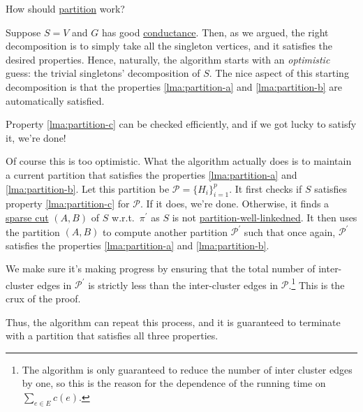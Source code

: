 \begin{problem*}
	How should \hyperref[algo:partition]{partition} work?
\end{problem*}
\begin{answer}
	Suppose \(S = V\) and \(G\) has good \hyperref[def:conductance]{conductance}. Then, as we argued, the right decomposition is to simply take all the singleton vertices, and it satisfies the desired properties. Hence, naturally, the algorithm starts with an \emph{optimistic} guess: the trivial singletons' decomposition of \(S\). The nice aspect of this starting decomposition is that the properties \autoref{lma:partition-a} and \autoref{lma:partition-b} are automatically satisfied.

	\begin{note}
		Property \autoref{lma:partition-c} can be checked efficiently, and if we got lucky to satisfy it, we're done!
	\end{note}

	Of course this is too optimistic. What the algorithm actually does is to maintain a current partition that satisfies the properties \autoref{lma:partition-a} and \autoref{lma:partition-b}. Let this partition be \(\mathcal{P} = \{ H_i \} _{i=1}^{p}\). It first checks if \(S\) satisfies property \autoref{lma:partition-c} for \(\mathcal{P} \). If it does, we're done. Otherwise, it finds a \hyperref[prb:non-uniform-sparsest-cut]{sparse cut} \((A, B)\) of \(S\) w.r.t.\ \(\pi ^{\prime} \) as \(S\) is not \hyperref[def:partition-and-boundary-well-linked]{partition-well-linkedned}. It then uses the partition \((A, B)\) to compute another partition \(\mathcal{P} ^{\prime} \) such that once again, \(\mathcal{P} ^{\prime} \) satisfies the properties \autoref{lma:partition-a} and \autoref{lma:partition-b}.

	\begin{note}
		We make sure it's making progress by ensuring that the total number of inter-cluster edges in \(\mathcal{P} ^{\prime} \) is strictly less than the inter-cluster edges in \(\mathcal{P} \).\footnote{The algorithm is only guaranteed to reduce the number of inter cluster edges by one, so this is the reason for the dependence of the running time on \(\sum_{e \in E} c(e)\).} This is the crux of the proof.
	\end{note}

	Thus, the algorithm can repeat this process, and it is guaranteed to terminate with a partition that satisfies all three properties.
\end{answer}

